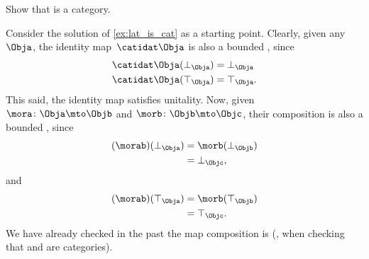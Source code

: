 \begin{exercise}
    \label{ex:boundlat_is_cat}
    Show that \BoundedLat is a category.
\end{exercise}

\begin{solution}
    Consider the solution of \cref{ex:lat_is_cat} as a starting point.
    Clearly, given any ~$\Obja$, the identity map~$\catidat\Obja$ is also a bounded , since
    \begin{equation}
        \begin{aligned}
            \catidat\Obja(\bot_\Obja) & =\bot_\Obja \\
            \catidat\Obja(\top_\Obja) & =\top_\Obja.
        \end{aligned}
    \end{equation}
    This said, the identity map satisfies unitality.
    Now, given  $\mora\colon \Obja \mto \Objb$ and $\morb\colon \Objb\mto \Objc$, their composition is also a bounded , since
    \begin{equation}
        \begin{aligned}
            (\morab)(\bot_\Obja)
             & = \morb(\bot_\Objb) \\
             & = \bot_\Objc,
        \end{aligned}
    \end{equation}
    and
    \begin{equation}
        \begin{aligned}
            (\morab)(\top_\Obja)
             & = \morb(\top_\Objb) \\
             & = \top_\Objc.
        \end{aligned}
    \end{equation}
    We have already checked in the past the map composition is  (\eg, when checking that \Set and \Pos are categories).
\end{solution}
